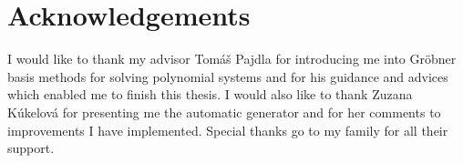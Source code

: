 \mbox{}\vfill

{\let\clearpage\relax\par \chapter*{Acknowledgements}}
I would like to thank my advisor Tom\'a\v s Pajdla for introducing me into Gr\"obner basis methods for solving polynomial systems and for his guidance and advices which enabled me to finish this thesis. I would also like to thank Zuzana K\'ukelov\'a for presenting me the automatic generator and for her comments to improvements I have implemented. Special thanks go to my family for all their support.
